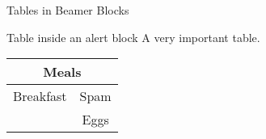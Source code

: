 
\begin{frame}{Tables in Beamer Blocks}

    \begin{alertblock}{Table inside an alert block}
    A very important table.
    
    \centering
    \begin{tabular}{|c|c|}
    \hline
        \multicolumn{2}{|c|}{Meals} \\ \hline
        Breakfast & Spam \\ \cline{2-2}
        & Eggs \\ \hline
    \end{tabular}
    \end{alertblock}
    
\end{frame}